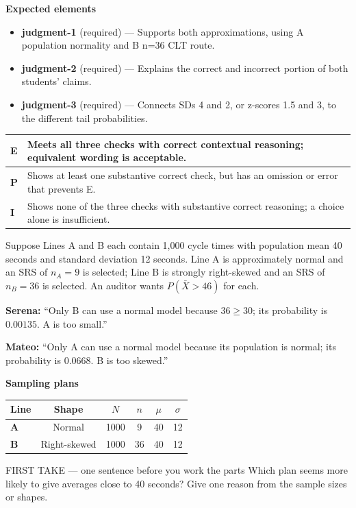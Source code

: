 \documentclass[11pt]{article}
\begin{document}
\textbf{Expected elements}
\begin{itemize}[leftmargin=1.5em,itemsep=2pt,topsep=2pt]
  \item \textbf{judgment-1} (required) --- Supports both approximations, using A population normality and B n=36 CLT route.
  \item \textbf{judgment-2} (required) --- Explains the correct and incorrect portion of both students' claims.
  \item \textbf{judgment-3} (required) --- Connects SDs 4 and 2, or z-scores 1.5 and 3, to the different tail probabilities.
\end{itemize}

{\small\renewcommand{\arraystretch}{1.25}
\noindent\begin{tabular}{|p{0.5in}|p{5.9in}|}
\hline
\textbf{E} & Meets all three checks with correct contextual reasoning; equivalent wording is acceptable. \\ \hline
\textbf{P} & Shows at least one substantive correct check, but has an omission or error that prevents E. \\ \hline
\textbf{I} & Shows none of the three checks with substantive correct reasoning; a choice alone is insufficient. \\ \hline
\end{tabular}}

\clearpage
{}

Suppose Lines A and B each contain 1{,}000 cycle times with population mean 40 seconds and standard deviation 12 seconds. Line A is approximately normal and an SRS of $n_A=9$ is selected; Line B is strongly right-skewed and an SRS of $n_B=36$ is selected. An auditor wants $P(\bar X>46)$ for each.\par\smallskip \textbf{Serena:} ``Only B can use a normal model because $36\geq30$; its probability is $0.00135$. A is too small.''\par \textbf{Mateo:} ``Only A can use a normal model because its population is normal; its probability is $0.0668$. B is too skewed.''\par
\begin{center}
\textbf{Sampling plans}\par\smallskip
\begin{tabular}{|l|c|c|c|c|c|}
\hline
\textbf{Line} & \textbf{Shape} & \textbf{$N$} & \textbf{$n$} & \textbf{$\mu$} & \textbf{$\sigma$} \\ \hline
\textbf{A} & Normal & 1000 & 9 & 40 & 12 \\ \hline
\textbf{B} & Right-skewed & 1000 & 36 & 40 & 12 \\ \hline
\end{tabular}
\end{center}
\begin{firsttakebox}{FIRST TAKE --- one sentence before you work the parts}
Which plan seems more likely to give averages close to 40 seconds? Give one reason from the sample sizes or shapes.\par
{}
\end{firsttakebox}
\end{document}
